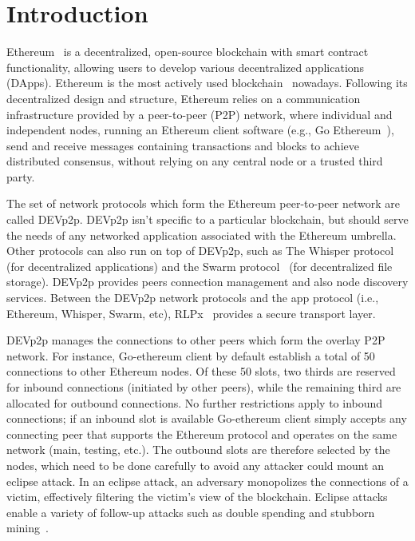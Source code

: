 
\section{Introduction}

Ethereum~\cite{} is a decentralized, open-source blockchain with smart contract functionality, allowing users to develop various decentralized applications (DApps).
Ethereum is the most actively used blockchain~\cite{bloomberg} nowadays.
Following its decentralized design and structure, Ethereum relies on a communication infrastructure provided by a peer-to-peer (P2P) network, where individual and independent nodes, running an Ethereum client software (e.g., Go Ethereum~\cite{go-ethereum}), send and receive messages  containing transactions and blocks to achieve distributed consensus,  without relying on any central node or a trusted third party.

The set of network protocols which form the Ethereum peer-to-peer network are called DEVp2p.  DEVp2p isn't specific to a particular blockchain, but should serve the needs of any networked application associated with the Ethereum umbrella.
Other protocols can also run on top of DEVp2p,  such as 
The Whisper protocol~\cite{} (for decentralized
applications) and the Swarm protocol~\cite{} (for decentralized file
storage).
DEVp2p provides peers connection management and also node discovery services.
Between the DEVp2p network protocols and the app protocol (i.e., Ethereum, Whisper, Swarm, etc), RLPx~\cite{} provides a secure transport layer. 

DEVp2p manages the connections to other peers which form the overlay P2P network.
For instance,  Go-ethereum client by default establish a total of 50  connections to other Ethereum nodes.  Of these 50 slots,  two thirds are reserved for inbound connections (initiated by other peers),  while the remaining third are allocated for outbound connections. 
No further restrictions apply to inbound connections; if an inbound slot is available
Go-ethereum client simply accepts any connecting peer that supports the
Ethereum protocol and operates on the same network (main,
testing, etc.). 
The outbound slots are therefore selected by the nodes, which need to be done carefully to avoid any attacker could mount an eclipse attack.
In an eclipse attack, an
adversary monopolizes the connections of a victim, effectively
filtering the victim’s view of the blockchain.  Eclipse attacks
enable a variety of follow-up attacks such as double spending
and stubborn mining~\cite{}.

